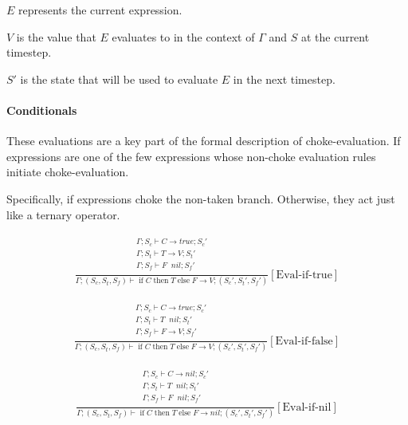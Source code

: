 \documentclass{scrartcl}
\DeclareMathOperator{\ifop}{if}
\DeclareMathOperator{\thenop}{then}
\DeclareMathOperator{\elseop}{else}
\DeclareMathOperator{\ceval}{\overset{C}{\rightarrow}}
\begin{document}
    $E$ represents the current expression.
    
    $V$ is the value that $E$ evaluates to in the context of $\Gamma$ and $S$ at the current timestep.
    
    $S'$ is the state that will be used to evaluate $E$ in the next timestep.
    
    \paragraph{Conditionals}
    
    These evaluations are a key part of the formal description of choke-evaluation. If expressions are one of the few expressions whose non-choke evaluation rules initiate choke-evaluation.
    
    Specifically, if expressions choke the non-taken branch. Otherwise, they act just like a ternary operator.
    
    \begin{align*}
    \frac{
        \begin{matrix}
        \Gamma; S_c \vdash C \rightarrow true; S_c' \\
        \Gamma; S_t \vdash T \rightarrow V; S_t' \\
        \Gamma; S_f \vdash F \ceval nil; S_f' \\
        \end{matrix}
    }{
        \Gamma; (S_c, S_t, S_f) \vdash \ifop C \thenop T \elseop F \rightarrow V; (S_c', S_t', S_f')
    }[\text{Eval-if-true}]
    \end{align*}
    
    \begin{align*}
    \frac{
        \begin{matrix}
        \Gamma; S_c \vdash C \rightarrow true; S_c' \\
        \Gamma; S_t \vdash T \ceval nil; S_t' \\
        \Gamma; S_f \vdash F \rightarrow V; S_f' \\
        \end{matrix}
    }{
        \Gamma; (S_c, S_t, S_f) \vdash \ifop C \thenop T \elseop F \rightarrow V; (S_c', S_t', S_f')
    }[\text{Eval-if-false}]
    \end{align*}
    
    \begin{align*}
    \frac{
        \begin{matrix}
        \Gamma; S_c \vdash C \rightarrow nil; S_c' \\
        \Gamma; S_t \vdash T \ceval nil; S_t' \\
        \Gamma; S_f \vdash F \ceval nil; S_f' \\
        \end{matrix}
    }{
        \Gamma; (S_c, S_t, S_f) \vdash \ifop C \thenop T \elseop F \rightarrow nil; (S_c', S_t', S_f')
    }[\text{Eval-if-nil}]
    \end{align*}
    
\end{document}
